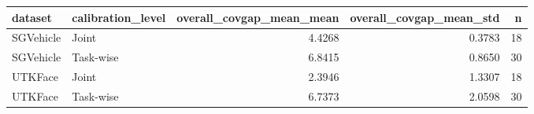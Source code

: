 \begin{tabular}{llrrr}
\toprule
dataset & calibration_level & overall_covgap_mean_mean & overall_covgap_mean_std & n \\
\midrule
SGVehicle & Joint & 4.4268 & 0.3783 & 18 \\
SGVehicle & Task-wise & 6.8415 & 0.8650 & 30 \\
UTKFace & Joint & 2.3946 & 1.3307 & 18 \\
UTKFace & Task-wise & 6.7373 & 2.0598 & 30 \\
\bottomrule
\end{tabular}
